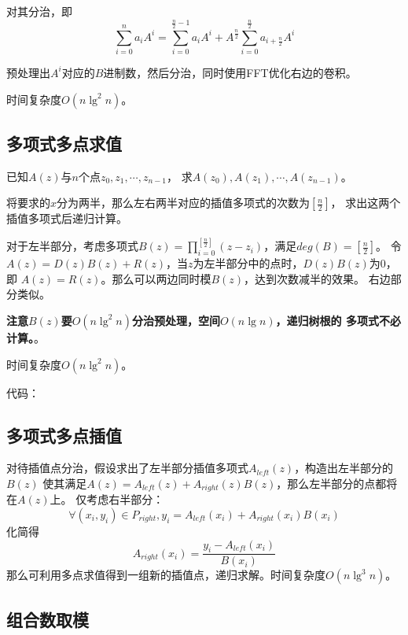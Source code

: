 对其分治，即
\begin{displaymath}
    \sum_{i=0}^n{a_iA^i}=\sum_{i=0}^{\frac{n}{2}-1}{a_iA^i}
    +A^{\frac{n}{2}}\sum_{i=0}^{\frac{n}{2}}{a_{i+\frac{n}{2}}A^i}
\end{displaymath}

预处理出$A^i$对应的$B$进制数，然后分治，同时使用FFT优化右边的卷积。

时间复杂度$O(n \lg^2 n)$。

\subsection{多项式多点求值}
已知$A(z)$与$n$个点$z_0,z_1,\cdots,z_{n-1}$，
求$A(z_0),A(z_1),\cdots,A(z_{n-1})$。

将要求的$x$分为两半，那么左右两半对应的插值多项式的次数为$[\frac{n}{2}]$，
求出这两个插值多项式后递归计算。

对于左半部分，考虑多项式$\displaystyle B(z)=\prod_{i=0}^
{[\frac{n}{2}]}(z-z_i)$，满足$deg(B)=[\frac{n}{2}]$。
令$A(z)=D(z)B(z)+R(z)$，当$z$为左半部分中的点时，$D(z)B(z)$为0，即
$A(z)=R(z)$。那么可以两边同时模$B(z)$，达到次数减半的效果。
右边部分类似。

{\bfseries 注意$B(z)$要$O(n\lg^2 n)$分治预处理，空间$O(n\lg n)$，递归树根的
多项式不必计算。}。

时间复杂度$O(n\lg^2n)$。

代码：

\subsection{多项式多点插值}

对待插值点分治，假设求出了左半部分插值多项式$A_{left}(z)$，构造出左半部分的$B(z)$
使其满足$A(z)=A_{left}(z)+A_{right}(z)B(z)$，那么左半部分的点都将在$A(z)$上。
仅考虑右半部分：
\begin{displaymath}
    \forall(x_i,y_i)\in P_{right},y_i=A_{left}(x_i)+A_{right}(x_i)B(x_i)
\end{displaymath}
化简得
\begin{displaymath}
    A_{right}(x_i)=\frac{y_i-A_{left}(x_i)}{B(x_i)}
\end{displaymath}
那么可利用多点求值得到一组新的插值点，递归求解。时间复杂度$O(n \lg^3 n)$。

\subsection{组合数取模}

